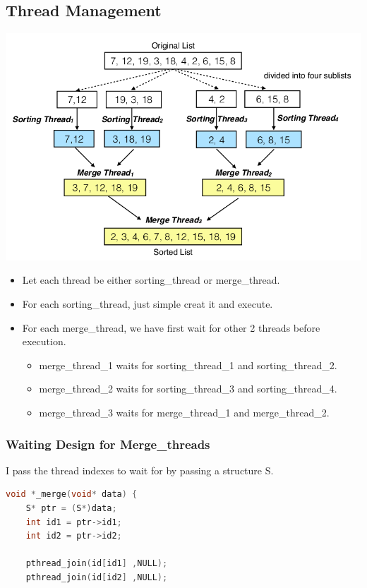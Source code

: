 \documentclass[12pt, a4paper]{article}
\begin{document}
\begin{CJK*}{UTF8}{bsmi}
        \subsection{Thread Management}
        \includegraphics{threads_graph.png}
        \begin{itemize}
        \item Let each thread be either sorting\_thread or merge\_thread.
        \item For each sorting\_thread, just simple creat it and execute.
        \item For each merge\_thread, we have first wait for other 2 threads before execution.
            \begin{itemize}
            \item merge\_thread\_1 waits for sorting\_thread\_1 and sorting\_thread\_2.
            \item merge\_thread\_2 waits for sorting\_thread\_3 and sorting\_thread\_4.
            \item merge\_thread\_3 waits for merge\_thread\_1 and merge\_thread\_2.
            \end{itemize}
        \end{itemize}

        \subsubsection{Waiting Design for Merge\_threads}
            I pass the thread indexes to wait for by passing a structure S.
\begin{lstlisting}[language=C++]
void *_merge(void* data) {
    S* ptr = (S*)data;
    int id1 = ptr->id1;
    int id2 = ptr->id2;

    pthread_join(id[id1] ,NULL);
    pthread_join(id[id2] ,NULL);


\end{lstlisting}
\end{CJK*}
\end{document}

